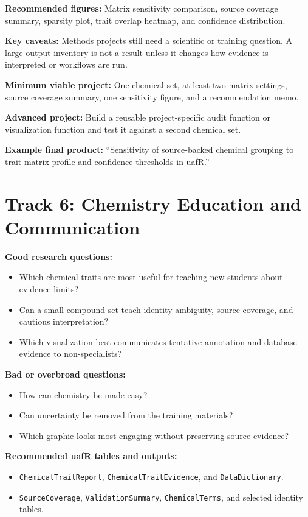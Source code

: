 \textbf{Recommended figures:} Matrix sensitivity comparison, source coverage summary, sparsity plot, trait overlap heatmap, and confidence distribution.

\textbf{Key caveats:} Methods projects still need a scientific or training question. A large output inventory is not a result unless it changes how evidence is interpreted or workflows are run.

\textbf{Minimum viable project:} One chemical set, at least two matrix settings, source coverage summary, one sensitivity figure, and a recommendation memo.

\textbf{Advanced project:} Build a reusable project-specific audit function or visualization function and test it against a second chemical set.

\textbf{Example final product:} ``Sensitivity of source-backed chemical grouping to trait matrix profile and confidence thresholds in uafR.''

\section{Track 6: Chemistry Education and Communication}
\textbf{Good research questions:}
\begin{itemize}
  \item Which chemical traits are most useful for teaching new students about evidence limits?
  \item Can a small compound set teach identity ambiguity, source coverage, and cautious interpretation?
  \item Which visualization best communicates tentative annotation and database evidence to non-specialists?
\end{itemize}

\textbf{Bad or overbroad questions:}
\begin{itemize}
  \item How can chemistry be made easy?
  \item Can uncertainty be removed from the training materials?
  \item Which graphic looks most engaging without preserving source evidence?
\end{itemize}

\textbf{Recommended uafR tables and outputs:}
\begin{itemize}
  \item \texttt{ChemicalTraitReport}, \texttt{ChemicalTraitEvidence}, and \texttt{DataDictionary}.
  \item \texttt{SourceCoverage}, \texttt{ValidationSummary}, \texttt{ChemicalTerms}, and selected identity tables.
\end{itemize}

